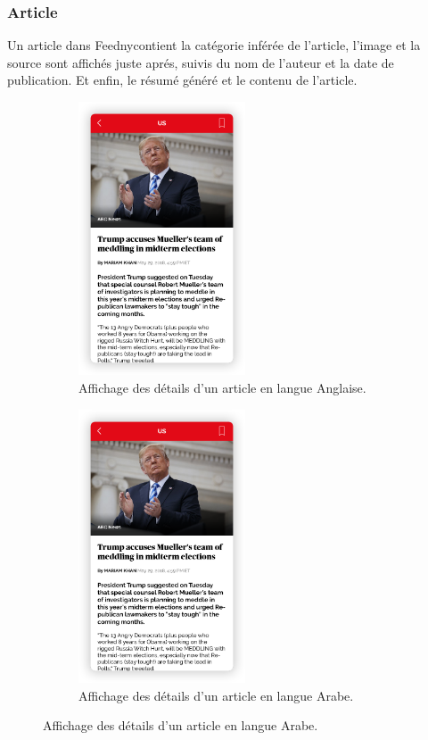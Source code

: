     \subsubsection{Article}
    Un article dans \textquotedbl Feedny\textquotedbl contient la catégorie inférée de l'article, l'image et la source sont affichés juste aprés, suivis du nom de l'auteur et la date de publication. Et enfin, le résumé généré et le contenu de l'article.   
        
        \begin{figure}[H]
           \begin{minipage}{0.48\textwidth}
             \begin{figure}[H]
                \centering
                \includegraphics[width=140pt]{img/chapter4/feedny/en-article.png}
                \caption{Affichage des détails d'un article en langue Anglaise.}
            \end{figure}
           \end{minipage}\hfill
           \begin {minipage}{0.48\textwidth}
             \begin{figure}[H]
                \centering
                \includegraphics[width=140pt]{img/chapter4/feedny/en-article.png}
                \caption{Affichage des détails d'un article en langue Arabe.}
            \end{figure}
           \end{minipage}
           \label{article-display}
        \end{figure}

